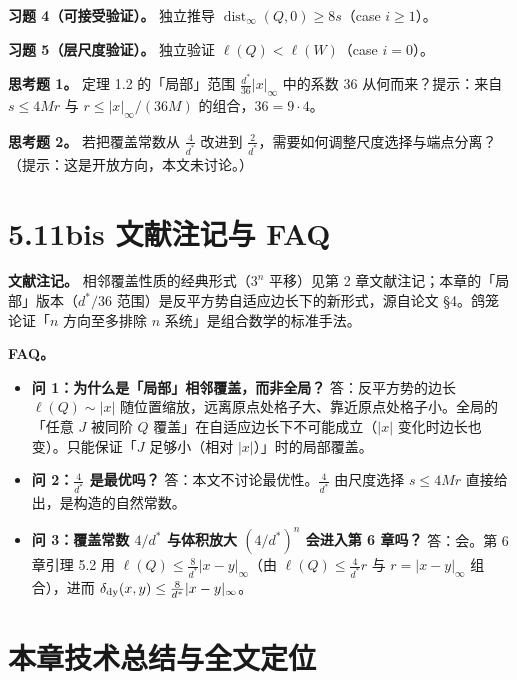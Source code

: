 \documentclass[a4paper,11pt,openany]{ctexbook}
\numberwithin{equation}{chapter}
\numberwithin{figure}{chapter}
\numberwithin{table}{chapter}
\begin{document}
\textbf{习题 4（可接受验证）。} 独立推导 $\operatorname{dist}_\infty(Q,0)\ge8s$（case $i\ge1$）。

\textbf{习题 5（层尺度验证）。} 独立验证 $\ell(Q)<\ell(W)$（case $i=0$）。

\textbf{思考题 1。} 定理 1.2 的「局部」范围 $\frac{d^*}{36}|x|_\infty$ 中的系数 $36$ 从何而来？提示：来自 $s\le4Mr$ 与 $r\le|x|_\infty/(36M)$ 的组合，$36=9\cdot4$。

\textbf{思考题 2。} 若把覆盖常数从 $\frac4{d^*}$ 改进到 $\frac2{d^*}$，需要如何调整尺度选择与端点分离？（提示：这是开放方向，本文未讨论。）

\section{5.11bis 文献注记与 FAQ}

\textbf{文献注记。} 相邻覆盖性质的经典形式（$3^n$ 平移）见第 2 章文献注记；本章的「局部」版本（$d^*/36$ 范围）是反平方势自适应边长下的新形式，源自论文 §4。鸽笼论证「$n$ 方向至多排除 $n$ 系统」是组合数学的标准手法。

\textbf{FAQ。}

\begin{itemize}
\item \textbf{问 1：为什么是「局部」相邻覆盖，而非全局？} 答：反平方势的边长 $\ell(Q)\sim|x|$ 随位置缩放，远离原点处格子大、靠近原点处格子小。全局的「任意 $J$ 被同阶 $Q$ 覆盖」在自适应边长下不可能成立（$|x|$ 变化时边长也变）。只能保证「$J$ 足够小（相对 $|x|$）」时的局部覆盖。
\end{itemize}

\begin{itemize}
\item \textbf{问 2：$\frac4{d^*}$ 是最优吗？} 答：本文不讨论最优性。$\frac4{d^*}$ 由尺度选择 $s\le4Mr$ 直接给出，是构造的自然常数。
\end{itemize}

\begin{itemize}
\item \textbf{问 3：覆盖常数 $4/d^*$ 与体积放大 $(4/d^*)^n$ 会进入第 6 章吗？} 答：会。第 6 章引理 5.2 用 $\ell(Q)\le\frac8{d^*}|x-y|_\infty$（由 $\ell(Q)\le\frac4{d^*}r$ 与 $r=|x-y|_\infty$ 组合），进而 $\delta_{\rm dy}(x,y)\le\frac8{d^*}|x-y|_\infty$。
\end{itemize}

\section{本章技术总结与全文定位}
\end{document}
